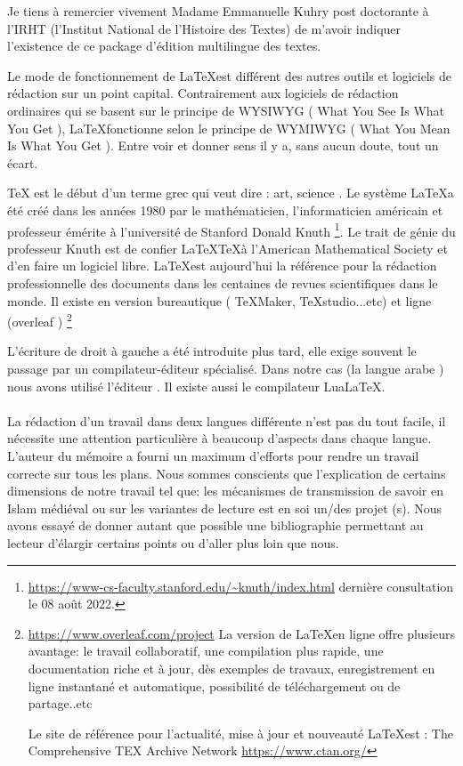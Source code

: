 \documentclass[a4paper,12pt]{report}
\begin{document}
\begin{itemize}
{Je tiens à remercier vivement Madame Emmanuelle Kuhry  post doctorante à l’IRHT (l'Institut National de l'Histoire des Textes) de m'avoir indiquer l'existence de ce package d'édition multilingue des textes.}  

\newpage 
\thispagestyle{empty}

 Le mode de fonctionnement de \LaTeX   est différent des autres outils et logiciels de rédaction sur un point capital. Contrairement aux logiciels de rédaction ordinaires qui se basent sur le principe de WYSIWYG ( What You See Is What You Get ), \LaTeX  fonctionne selon le principe de WYMIWYG  ( What You Mean Is What You Get ).   Entre voir et donner sens il y a, sans aucun doute,  tout un écart. 


TeX est le début d'un terme grec qui veut dire : art, science . Le système \LaTeX   a été créé dans les années 1980  par le mathématicien, l'informaticien américain et  professeur émérite à l'université de Stanford Donald Knuth   \footnote{  \url { https://www-cs-faculty.stanford.edu/~knuth/index.html} dernière consultation le 08  août 2022. }. Le trait de génie du professeur  Knuth est de confier \LaTeX \TeX à l'American Mathematical Society et d'en faire un logiciel libre.  \LaTeX est aujourd'hui la référence pour la rédaction  professionnelle des documents dans les centaines de revues scientifiques dans le monde. Il existe en version bureautique ( \TeX Maker, \TeX studio...etc)  
et ligne (overleaf \aiOverleaf ) \footnote {\url{https://www.overleaf.com/project} La version de \LaTeX en ligne \aiOverleaf 
offre plusieurs avantage: le travail collaboratif, une compilation plus rapide, une documentation riche et à jour, dès exemples de travaux,  enregistrement en ligne instantané et automatique, possibilité de téléchargement ou de partage..etc

Le site de référence pour l'actualité, mise à jour et nouveauté \LaTeX  est : The Comprehensive TEX Archive Network \url{ https://www.ctan.org/}
}   

L'écriture de droit à gauche a été introduite plus tard, elle exige souvent le passage  par un compilateur-éditeur spécialisé. Dans notre  cas (la langue arabe ) nous avons utilisé l'éditeur  \XeLaTeX. Il existe aussi le compilateur Lua\LaTeX .  

\paragraph{
}La rédaction d'un travail  dans deux langues différente n'est pas du tout facile, il nécessite une attention particulière à beaucoup d'aspects dans chaque langue. L'auteur du mémoire a fourni un maximum d'efforts pour rendre un travail correcte sur tous les plans. Nous sommes conscients que l'explication de certains dimensions de notre travail tel que: les mécanismes de transmission de savoir en Islam médiéval ou sur les variantes de lecture  est en soi un/des projet (s). Nous avons essayé de donner autant que possible une bibliographie permettant au lecteur d'élargir certains points ou d'aller plus loin que nous. 










\end{itemize}
\end{document}

